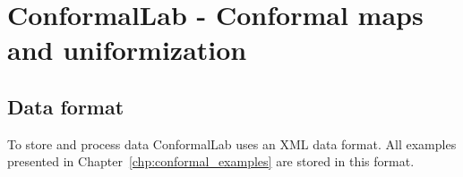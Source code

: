 \documentclass[Thesis.tex]{subfiles}
\begin{document}
\chapter{{\sc ConformalLab} - Conformal maps and uniformization}
\label{chp:conformallab}

\section{Data format}
To store and process data {\sc ConformalLab} uses an {\sc XML} data format.
All examples presented in Chapter~\ref{chp:conformal_examples} are stored
in this format.

\subfilebibliography
\end{document}

